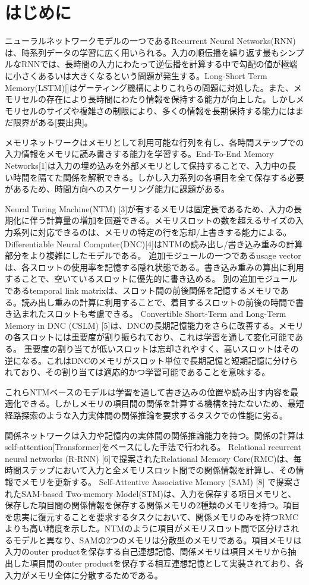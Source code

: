 \chapter{はじめに}
ニューラルネットワークモデルの一つであるRecurrent Neural Networks(RNN)は、時系列データの学習に広く用いられる。入力の順伝播を繰り返す最もシンプルなRNNでは、長時間の入力にわたって逆伝播を計算する中で勾配の値が極端に小さくあるいは大きくなるという問題が発生する。Long-Short Term Memory(LSTM)[]はゲーティング機構によりこれらの問題に対処した。また、メモリセルの存在により長時間にわたり情報を保持する能力が向上した。しかしメモリセルのサイズや複雑さの制限により、多くの情報を長期保持する能力にはまだ限界がある[要出典]。

メモリネットワークはメモリとして利用可能な行列を有し、各時間ステップでの入力情報をメモリに読み書きする能力を学習する。End-To-End Memory Networks[1]は入力の埋め込みを外部メモリとして保持することで、入力中の長い時間を隔てた関係を解釈できる。しかし入力系列の各項目を全て保存する必要があるため、時間方向へのスケーリング能力に課題がある。

Neural Turing Machine(NTM) [3]が有するメモリは固定長であるため、入力の長期化に伴う計算量の増加を回避できる。メモリスロットの数を超えるサイズの入力系列に対応できるのは、メモリの特定の行を忘却/上書きする能力による。
Differentiable Neural Computer(DNC)[4]はNTMの読み出し/書き込み重みの計算部分をより複雑にしたモデルである。
追加モジュールの一つであるusage vectorは、各スロットの使用率を記憶する隠れ状態である。書き込み重みの算出に利用することで、空いているスロットに優先的に書き込める。
別の追加モジュールであるtemporal link matrixは、スロット間の前後関係を記憶するメモリである。読み出し重みの計算に利用することで、着目するスロットの前後の時間で書き込まれたスロットも考慮できる。
Convertible Short-Term and Long-Term Memory in DNC  (CSLM) [5]は、DNCの長期記憶能力をさらに改善する。メモリの各スロットには重要度が割り振られており、これは学習を通して変化可能である。
重要度の割り当てが低いスロットは忘却されやすく、高いスロットはその逆になる。これはDNCのメモリがスロット単位で長期記憶と短期記憶に分けられており、その割り当ては適応的かつ学習可能であることを意味する。

これらNTMベースのモデルは学習を通して書き込みの位置や読み出す内容を最適化できる。しかしメモリの項目間の関係を計算する機構を持たないため、最短経路探索のような入力実体間の関係推論を要求するタスクでの性能に劣る。

関係ネットワークは入力や記憶内の実体間の関係推論能力を持つ。関係の計算はself-attention[Transformer]をベースにした手法で行われる。
Relational recurrent neural networks (R-RNN) [6]で提案されたRelational Memory Core(RMC)は、毎時間ステップにおいて入力と全メモリスロット間での関係情報を計算し、その情報でメモリを更新する。
Self-Attentive Associative Memory (SAM) [8] で提案されたSAM-based Two-memory Model(STM)は、入力を保存する項目メモリと、保存した項目間の関係情報を保存する関係メモリの2種類のメモリを持つ。項目を忠実に復元することを要求するタスクにおいて、関係メモリのみを持つRMCよりも高い精度を示した。NTMのように項目がメモリスロット間で区分けされるモデルと異なり、SAMの2つのメモリは分散型のメモリである。項目メモリは入力のouter productを保存する自己連想記憶、関係メモリは項目メモリから抽出した項目間のouter productを保存する相互連想記憶として実装されており、各入力がメモリ全体に分散するためである。

